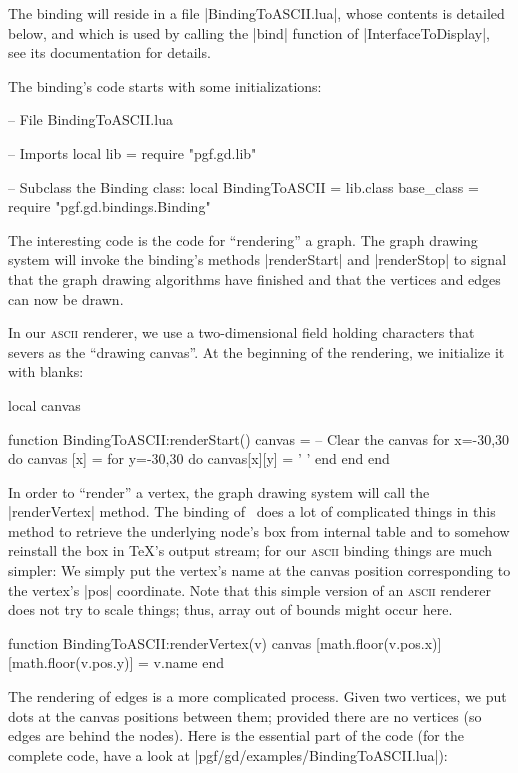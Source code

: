 The binding will reside in a file |BindingToASCII.lua|, whose contents
is detailed below, and which is used by calling the |bind| function of
|InterfaceToDisplay|, see its documentation for details.

The binding's code starts with some initializations:

\begin{codeexample}
-- File BindingToASCII.lua

-- Imports
local lib = require "pgf.gd.lib"

-- Subclass the Binding class:
local BindingToASCII = lib.class { base_class = require "pgf.gd.bindings.Binding" }
\end{codeexample}

The interesting code is the code for
``rendering'' a graph. The graph drawing system will invoke the
binding's methods |renderStart| and |renderStop| to signal that the
graph drawing algorithms have finished and that the vertices and edges
can now be drawn.

In our \textsc{ascii} renderer, we use a two-dimensional field holding 
characters that severs as the ``drawing canvas''. At the beginning of
the rendering, we initialize it with blanks:

\begin{codeexample}
local canvas
  
function BindingToASCII:renderStart()
  canvas = {}
  -- Clear the canvas
  for x=-30,30 do
    canvas [x] = {}
    for y=-30,30 do
      canvas[x][y] = ' '
    end
  end
end
\end{codeexample}

In order to ``render'' a vertex, the graph drawing system will call
the |renderVertex| method. The binding of \tikzname\ does a lot of
complicated things in this method to retrieve the underlying node's
box from internal table and to somehow reinstall the box in \TeX's
output stream; for our \textsc{ascii} binding things are much simpler:
We simply put the vertex's name at the canvas position corresponding
to the vertex's |pos| coordinate. Note that this simple version of an
\textsc{ascii} renderer does not try to scale things; thus, array out
of bounds might occur here.

\begin{codeexample}
function BindingToASCII:renderVertex(v)
  canvas [math.floor(v.pos.x)][math.floor(v.pos.y)] = v.name
end
\end{codeexample}

The rendering of edges is a more complicated process. Given two
vertices, we put dots at the canvas positions between them; provided
there are no vertices (so edges are behind the nodes). Here is the
essential part of the code (for the complete code, have a look at
|pgf/gd/examples/BindingToASCII.lua|):


